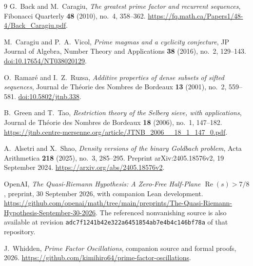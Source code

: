 \documentclass[11pt]{article}
\theoremstyle{definition}
\theoremstyle{remark}
\newcommand{\lean}[1]{\nolinkurl{#1}}
\begin{document}
\clearpage
\begin{thebibliography}{9}
G.~Back and M.~Caragiu,
\emph{The greatest prime factor and recurrent sequences},
Fibonacci Quarterly \textbf{48} (2010), no.~4, 358--362.
\url{https://fq.math.ca/Papers1/48-4/Back_Caragiu.pdf}.

M.~Caragiu and P.~A.~Vicol,
\emph{Prime magmas and a cyclicity conjecture},
JP Journal of Algebra, Number Theory and Applications
\textbf{38} (2016), no.~2, 129--143.
\href{https://doi.org/10.17654/NT038020129}{doi:10.17654/NT038020129}.

O.~Ramar\'e and I.~Z.~Ruzsa,
\emph{Additive properties of dense subsets of sifted sequences},
Journal de Th\'eorie des Nombres de Bordeaux
\textbf{13} (2001), no.~2, 559--581.
\href{https://doi.org/10.5802/jtnb.338}{doi:10.5802/jtnb.338}.

B.~Green and T.~Tao,
\emph{Restriction theory of the Selberg sieve, with applications},
Journal de Th\'eorie des Nombres de Bordeaux
\textbf{18} (2006), no.~1, 147--182.
\url{https://jtnb.centre-mersenne.org/article/JTNB_2006__18_1_147_0.pdf}.

A.~Alsetri and X.~Shao,
\emph{Density versions of the binary Goldbach problem},
Acta Arithmetica \textbf{218} (2025), no.~3, 285--295.
Preprint arXiv:2405.18576v2, 19 September 2024.
\url{https://arxiv.org/abs/2405.18576v2}.

OpenAI,
\emph{The Quasi-Riemann Hypothesis: A Zero-Free Half-Plane
\(\operatorname{Re}(s)>7/8\)},
preprint, 30 September 2026, with companion Lean development.
\url{https://github.com/openai/math/tree/main/preprints/The-Quasi-Riemann-Hypothesis-September-30-2026}.
The referenced nonvanishing source is also available at revision
\lean{adc7f1241b42e322a6451854ab7e4b4c146bf78a} of that repository.

J.~Whidden,
\emph{Prime Factor Oscillations}, companion source and formal proofs,
2026.
\url{https://github.com/kimihiro64/prime-factor-oscillations}.
\end{thebibliography}
\end{document}
